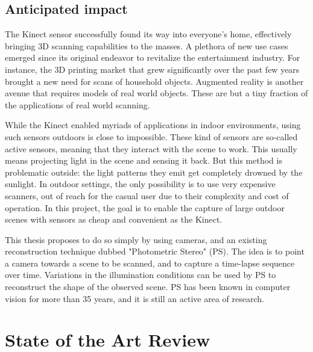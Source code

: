 \documentclass{report}
\begin{document}
\section{Anticipated impact}

The Kinect sensor successfully found its way into everyone's home, effectively bringing 3D scanning capabilities to the masses. A plethora of new use cases emerged since its original endeavor to revitalize the entertainment industry. For instance, the 3D printing market that grew significantly over the past few years brought a new need for scans of household objects. Augmented reality is another avenue that requires models of real world objects. These are but a tiny fraction of the applications of real world scanning.

While the Kinect enabled myriads of applications in indoor environments, using such sensors outdoors is close to impossible. These kind of sensors are so-called active sensors, meaning that they interact with the scene to work. This usually means projecting light in the scene and sensing it back. But this method is problematic outside: the light patterns they emit get completely drowned by the sunlight. In outdoor settings, the only possibility is to use very expensive scanners, out of reach for the casual user due to their complexity and cost of operation. In this project, the goal is to enable the capture of large outdoor scenes with sensors as cheap and convenient as the Kinect.

This thesis proposes to do so simply by using cameras, and an existing reconstruction technique dubbed "Photometric Stereo" (PS). The idea is to point a camera towards a scene to be scanned, and to capture a time-lapse sequence over time. Variations in the illumination conditions can be used by PS to reconstruct the shape of the observed scene. PS has been known in computer vision for more than 35 years, and it is still an active area of research.


\chapter{State of the Art Review}
\label{c:sota}

\end{document}
